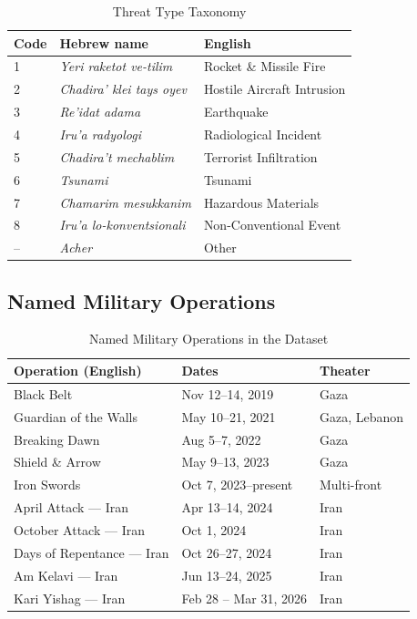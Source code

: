 \documentclass[12pt,a4paper]{article}
\begin{document}
\begin{table}[H]\centering
\caption{Threat Type Taxonomy}
\label{tab:threats}
\begin{tabular}{lll}\toprule
\textbf{Code} & \textbf{Hebrew name} & \textbf{English} \\\midrule
1 & \textit{Yeri raketot ve-tilim}      & Rocket \& Missile Fire \\
2 & \textit{Chadira' klei tays oyev}    & Hostile Aircraft Intrusion \\
3 & \textit{Re'idat adama}              & Earthquake \\
4 & \textit{Iru'a radyologi}            & Radiological Incident \\
5 & \textit{Chadira't mechablim}        & Terrorist Infiltration \\
6 & \textit{Tsunami}                    & Tsunami \\
7 & \textit{Chamarim mesukkanim}        & Hazardous Materials \\
8 & \textit{Iru'a lo-konventsionali}    & Non-Conventional Event \\
-- & \textit{Acher}                     & Other \\\bottomrule
\end{tabular}
\end{table}

\subsection{Named Military Operations}

\begin{table}[H]\centering
\caption{Named Military Operations in the Dataset}
\label{tab:ops}
\begin{tabular}{lll}\toprule
\textbf{Operation (English)} & \textbf{Dates} & \textbf{Theater} \\\midrule
Black Belt                   & Nov 12--14, 2019       & Gaza \\
Guardian of the Walls        & May 10--21, 2021       & Gaza, Lebanon \\
Breaking Dawn                & Aug 5--7, 2022         & Gaza \\
Shield \& Arrow              & May 9--13, 2023        & Gaza \\
Iron Swords                  & Oct 7, 2023--present   & Multi-front \\
April Attack --- Iran        & Apr 13--14, 2024       & Iran \\
October Attack --- Iran      & Oct 1, 2024            & Iran \\
Days of Repentance --- Iran  & Oct 26--27, 2024       & Iran \\
Am Kelavi --- Iran           & Jun 13--24, 2025       & Iran \\
Kari Yishag --- Iran         & Feb 28 -- Mar 31, 2026 & Iran \\\bottomrule
\end{tabular}
\end{table}
\end{document}
